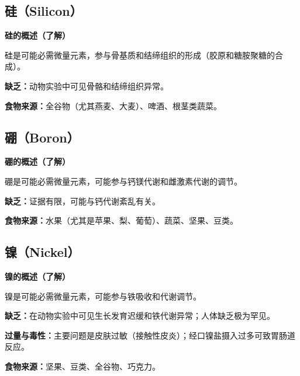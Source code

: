\subsection{硅（Silicon）}

\begin{tipbox}
\textbf{硅的概述（了解）}

硅是可能必需微量元素，参与骨基质和结缔组织的形成（胶原和糖胺聚糖的合成）。

\textbf{缺乏：}动物实验中可见骨骼和结缔组织异常。

\textbf{食物来源：}全谷物（尤其燕麦、大麦）、啤酒、根茎类蔬菜。
\end{tipbox}

\subsection{硼（Boron）}

\begin{tipbox}
\textbf{硼的概述（了解）}

硼是可能必需微量元素，可能参与钙镁代谢和雌激素代谢的调节。

\textbf{缺乏：}证据有限，可能与钙代谢紊乱有关。

\textbf{食物来源：}水果（尤其是苹果、梨、葡萄）、蔬菜、坚果、豆类。
\end{tipbox}

\subsection{镍（Nickel）}

\begin{tipbox}
\textbf{镍的概述（了解）}

镍是可能必需微量元素，可能参与铁吸收和代谢调节。

\textbf{缺乏：}在动物实验中可见生长发育迟缓和铁代谢异常；人体缺乏极为罕见。

\textbf{过量与毒性：}主要问题是皮肤过敏（接触性皮炎）；经口镍盐摄入过多可致胃肠道反应。

\textbf{食物来源：}坚果、豆类、全谷物、巧克力。
\end{tipbox}

